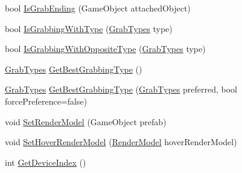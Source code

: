 \begin{DoxyCompactItemize}
\item 
bool \mbox{\hyperlink{class_valve_1_1_v_r_1_1_interaction_system_1_1_hand_af0f01b740ecc869ae14ec6c1be426461}{Is\+Grab\+Ending}} (Game\+Object attached\+Object)
\item 
bool \mbox{\hyperlink{class_valve_1_1_v_r_1_1_interaction_system_1_1_hand_ac642ffef19ad03b4133a8ea5f3f15214}{Is\+Grabbing\+With\+Type}} (\mbox{\hyperlink{namespace_valve_1_1_v_r_1_1_interaction_system_ae03ab84d315f5997fd000817bfb96a0f}{Grab\+Types}} type)
\item 
bool \mbox{\hyperlink{class_valve_1_1_v_r_1_1_interaction_system_1_1_hand_af1cc27ee298744bab84a74e7f69a266c}{Is\+Grabbing\+With\+Opposite\+Type}} (\mbox{\hyperlink{namespace_valve_1_1_v_r_1_1_interaction_system_ae03ab84d315f5997fd000817bfb96a0f}{Grab\+Types}} type)
\item 
\mbox{\hyperlink{namespace_valve_1_1_v_r_1_1_interaction_system_ae03ab84d315f5997fd000817bfb96a0f}{Grab\+Types}} \mbox{\hyperlink{class_valve_1_1_v_r_1_1_interaction_system_1_1_hand_aef5b383b995bb0674bf3e53eaadd76e6}{Get\+Best\+Grabbing\+Type}} ()
\item 
\mbox{\hyperlink{namespace_valve_1_1_v_r_1_1_interaction_system_ae03ab84d315f5997fd000817bfb96a0f}{Grab\+Types}} \mbox{\hyperlink{class_valve_1_1_v_r_1_1_interaction_system_1_1_hand_a84aa1ad8bda624c7aeb2375e51f83797}{Get\+Best\+Grabbing\+Type}} (\mbox{\hyperlink{namespace_valve_1_1_v_r_1_1_interaction_system_ae03ab84d315f5997fd000817bfb96a0f}{Grab\+Types}} preferred, bool force\+Preference=false)
\item 
void \mbox{\hyperlink{class_valve_1_1_v_r_1_1_interaction_system_1_1_hand_a0f9adcb3132f27a46f2cc32aa5e81e9c}{Set\+Render\+Model}} (Game\+Object prefab)
\item 
void \mbox{\hyperlink{class_valve_1_1_v_r_1_1_interaction_system_1_1_hand_a72456d7c614cd98409a2170db64cf7de}{Set\+Hover\+Render\+Model}} (\mbox{\hyperlink{class_valve_1_1_v_r_1_1_interaction_system_1_1_render_model}{Render\+Model}} hover\+Render\+Model)
\item 
int \mbox{\hyperlink{class_valve_1_1_v_r_1_1_interaction_system_1_1_hand_a247041056841620b9fa58a5fbb0c3fc8}{Get\+Device\+Index}} ()
\end{DoxyCompactItemize}
